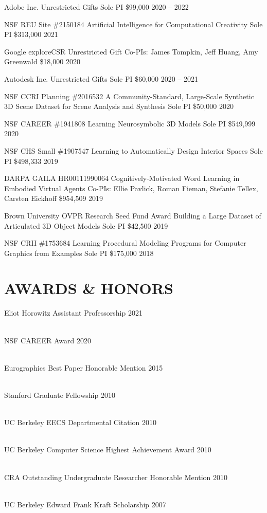 \documentclass[line,margin]{res}
\begin{document}
\begin{resume}
\funding
{Adobe Inc.}
{Unrestricted Gifts}
{Sole PI}
{\$99,000}
{2020 -- 2022}

\funding
{NSF REU Site \#2150184}
{Artificial Intelligence for Computational Creativity}
{Sole PI}
{\$313,000}
{2021}

\funding
{Google exploreCSR}
{Unrestricted Gift}
{Co-PIs: James Tompkin, Jeff Huang, Amy Greenwald}
{\$18,000}
{2020}

\funding
{Autodesk Inc.}
{Unrestricted Gifts}
{Sole PI}
{\$60,000}
{2020 -- 2021}

\funding
{NSF CCRI Planning \#2016532}
{A Community-Standard, Large-Scale Synthetic 3D Scene Dataset for Scene Analysis and Synthesis}
{Sole PI}
{\$50,000}
{2020}

\funding
{NSF CAREER \#1941808}
{Learning Neurosymbolic 3D Models}
{Sole PI}
{\$549,999}
{2020}

\funding
{NSF CHS Small \#1907547}
{Learning to Automatically Design Interior Spaces}
{Sole PI}
{\$498,333}
{2019}

\funding
{DARPA GAILA HR00111990064}
{Cognitively-Motivated Word Learning in Embodied Virtual Agents}
{Co-PIs: Ellie Pavlick, Roman Fieman, Stefanie Tellex, Carsten Eickhoff}
{\$954,509}
{2019}

\funding
{Brown University OVPR Research Seed Fund Award}
{Building a Large Dataset of Articulated 3D Object Models}
{Sole PI}
{\$42,500}
{2019}

\funding
{NSF CRII \#1753684}
{Learning Procedural Modeling Programs for Computer Graphics from Examples}
{Sole PI}
{\$175,000}
{2018}


\section{AWARDS \& HONORS}

\newcommand{\award}[2] {
	#1 \hfill #2
}

\award
{Eliot Horowitz Assistant Professorship}
{2021}
\\
\award
{NSF CAREER Award}
{2020}
\\
\award
{Eurographics Best Paper Honorable Mention}
{2015}
\\
\award
{Stanford Graduate Fellowship}
{2010}
\\
\award
{UC Berkeley EECS Departmental Citation}
{2010}
\\
\award
{UC Berkeley Computer Science Highest Achievement Award}
{2010}
\\
\award
{CRA Outstanding Undergraduate Researcher Honorable Mention}
{2010}
\\
\award
{UC Berkeley Edward Frank Kraft Scholarship}
{2007}


\end{resume}
\end{document}
